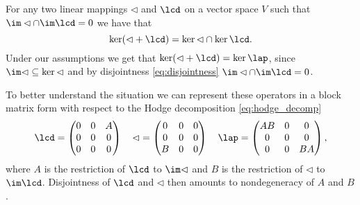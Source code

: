 \begin{remark}
 For any two linear mappings $\lhd$ and $\lcd$ on a vector space $V$ such that $\im\lhd\cap\im\lcd = 0$ we have that \[ \ker (\lhd + \lcd)  = \ker \lhd \cap \ker \lcd.\] Under our assumptions we get that $\ker (\lhd +\lcd) = \ker \lap$, since $\im \lhd \subseteq \ker \lhd$ and by disjointness \eqref{eq:disjointness} $\im \lhd \cap \im \lcd = 0$.
\end{remark}


To better understand the situation we can represent these operators in a block matrix form with respect to the Hodge decomposition \eqref{eq:hodge_decomp}
\[
 \lcd = \begin{pmatrix} 0 & 0 & A\\0&0&0\\0&0&0\end{pmatrix} \quad \lhd = \begin{pmatrix} 0 & 0 &0\\0&0&0\\ B&0&0\end{pmatrix} \quad
 \lap = \begin{pmatrix}
	  AB & 0 & 0 \\
	  0 & 0 & 0 \\
	  0 & 0 & BA
	\end{pmatrix},
\]
where $A$ is the restriction of $\lcd$ to $\im\lhd$ and $B$ is the restriction of $\lhd$ to $\im \lcd$. Disjointness of $\lcd$ and $\lhd$ then amounts to nondegeneracy of $A$ and $B$.

